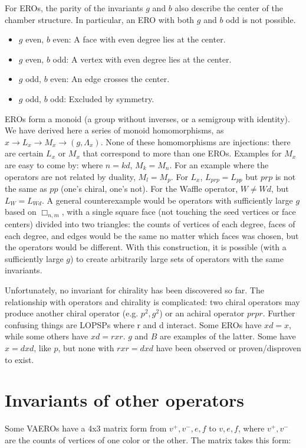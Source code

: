 \documentclass{amsart}[12pt]
\begin{document}
For EROs, the parity of the invariants $g$ and $b$ also describe the center of the chamber structure.
In particular, an ERO with both $g$ and $b$ odd is not possible.
\begin{itemize}
  \item $g$ even, $b$ even: A face with even degree lies at the center.
  \item $g$ even, $b$ odd: A vertex with even degree lies at the center.
  \item $g$ odd, $b$ even: An edge crosses the center.
  \item $g$ odd, $b$ odd: Excluded by symmetry.
\end{itemize}

EROs form a monoid (a group without inverses, or a semigroup with identity).
We have derived here a series of monoid homomorphisms, as
$ x \to L_x \to M_x \to (g, \Lambda_x)$.
None of these homomorphisms are injections: there are certain
$L_x$ or $M_x$ that correspond to more than one EROs. Examples for $M_x$ are
easy to come by: where $n = kd$, $M_k = M_n$. For an example where the
operators are not related by duality, $M_l = M_p$. For $L_x$, $L_{prp} =
L_{pp}$ but $prp$ is not the same as $pp$ (one's chiral, one's not). For the
Waffle operator, $W \ne Wd$, but $L_W = L_{Wd}$. A general counterexample would
be operators with sufficiently large $g$ based on $\Box_{n,m}$, with a single
square face (not touching the seed vertices or face centers) divided into two
triangles: the counts of vertices of each degree, faces of each degree, and
edges would be the same no matter which faces was chosen, but the operators
would be different. With this construction, it is possible (with a sufficiently
large $g$) to create arbitrarily large sets of operators with the same
invariants.

Unfortunately, no invariant for chirality has been discovered so far. The
relationship with operators and chirality is complicated: two chiral operators
may produce another chiral operator (e.g. $p^2, g^2$) or an achiral operator
$prpr$. Further confusing things are LOPSPs where r and d interact. Some EROs
have $xd = x$, while some others have $xd = rxr$. $g$ and $B$ are examples of
the latter. Some have $x = dxd$, like $p$, but none with $rxr = dxd$ have been
observed or proven/disproven to exist.

\section{Invariants of other operators}
Some VAEROs have a 4x3 matrix form from $v^+, v^-, e, f$ to $v, e, f$, where
$v^+, v^-$ are the counts of vertices of one color or the other. The matrix takes
this form:
\end{document}
